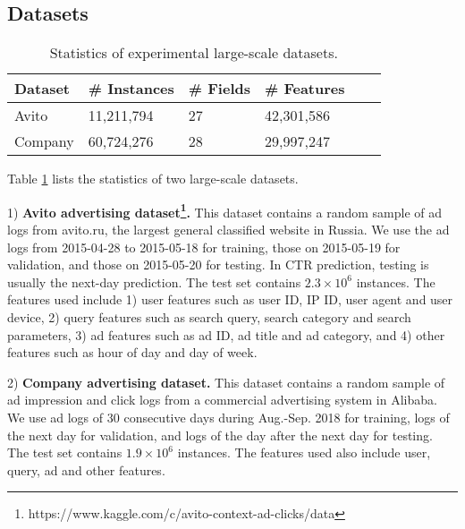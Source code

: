 \documentclass{article}
\begin{document}
\subsection{Datasets}
\begin{table}[!t]
\renewcommand{\arraystretch}{1.2}
\centering
\begin{tabular}{|l|l|l|l|l|l|}
\hline
\textbf{Dataset} & \textbf{\# Instances} & \textbf{\# Fields} & \textbf{\# Features} \\
\hline
Avito & 11,211,794 & 27 & 42,301,586 \\
\hline
Company & 60,724,276 & 28 & 29,997,247 \\
\hline
\end{tabular}
\vskip -4pt
\caption{Statistics of experimental large-scale datasets.}
\label{tab_stat}
\end{table}

Table \ref{tab_stat} lists the statistics of two large-scale datasets.

1) \textbf{Avito advertising dataset\footnote{https://www.kaggle.com/c/avito-context-ad-clicks/data}.}
This dataset contains a random sample of ad logs from avito.ru, the largest general classified website in Russia.
We use the ad logs from 2015-04-28 to 2015-05-18 for training, those on 2015-05-19 for validation, and those on 2015-05-20 for testing. In CTR prediction, testing is usually the next-day prediction. The test set contains $2.3\times 10^6$ instances.
The features used include 1) user features such as user ID, IP ID, user agent and user device, 2) query features such as search query, search category and search parameters, 3) ad features such as ad ID, ad title and ad category, and 4) other features such as hour of day and day of week.

2) \textbf{Company advertising dataset.}
This dataset contains a random sample of ad impression and click logs from a commercial advertising system in Alibaba. We use ad logs of 30 consecutive days during Aug.-Sep. 2018 for training, logs of the next day for validation, and logs of the day after the next day for testing.  The test set contains $1.9\times 10^6$ instances.
The features used also include user, query, ad and other features.
\end{document}
